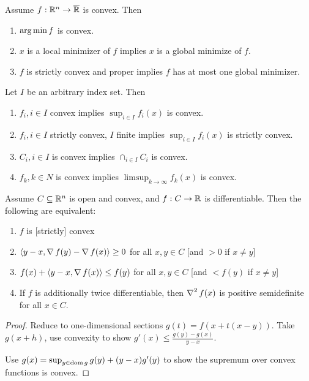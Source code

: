 \begin{thm}
  \label{sec:convexity-7}
  Assume $f: \mathbb{R}^{n} \rightarrow \overline {\mathbb{R}}$ is convex. Then
  \begin{enumerate}
  \item $\operatorname*{arg\,min} f$ is convex.
  \item $x$ is a local minimizer of $f$ implies $x$ is a global
    minimize of $f$.
  \item $f$ is strictly convex and proper implies $f$ has at most one
    global minimizer.
  \end{enumerate}
\end{thm}

\begin{thm}
  \label{sec:convexity-8}
  Let $I$ be an arbitrary index set. Then
  \begin{enumerate}
  \item $f_{i}, i \in I$ convex implies $\sup_{i \in I} f_{i}(x)$ is
    convex.
  \item $f_{i}, i \in I$ strictly convex, $I$ finite implies $\sup_{i
      \in I} f_{i}(x)$ is strictly convex.
  \item $C_{i}, i \in I$ is convex implies $\cap_{i \in I} C_{i}$ is convex.
  \item $f_{k}, k \in N$ is convex implies $\limsup_{k \rightarrow
      \infty} f_{k}(x)$ is convex.
  \end{enumerate}
\end{thm}

\begin{thm}
  \label{sec:convexity-9}
  Assume $C \subseteq \mathbb{R}^{n}$ is open and convex, and $f: C
  \rightarrow \mathbb{R}$ is differentiable. Then the following are
  equivalent:
  \begin{enumerate}
  \item $f$ is [strictly] convex
  \item $\IP{y-x, \grad f(y) - \grad f(x)} \geq 0$ for all $x, y \in
    C$ [and $> 0$ if $x \neq y$]
  \item $f(x) + \IP{y- x, \grad f(x)} \leq f(y)$ for all $x, y \in C$
    [and $< f(y)$ if $x \neq y$]
  \item If $f$ is additionally twice differentiable, then $\operatorname{\nabla}^{2}
    f(x)$ is positive semidefinite for all $x \in C$.
  \end{enumerate}
\end{thm}

\begin{proof}
  Reduce to one-dimensional sections $g(t) = f(x + t(x-y))$.  Take
  $g(x+h)$, use convexity to show $g'(x) \leq \frac{g(y) -
    g(x)}{y-x}$.

  Use $g(x) = \sup_{y \in \operatorname*{dom} g} g(y) + (y-x) g'(y)$ to show the
  supremum over convex functions is convex.
\end{proof}

